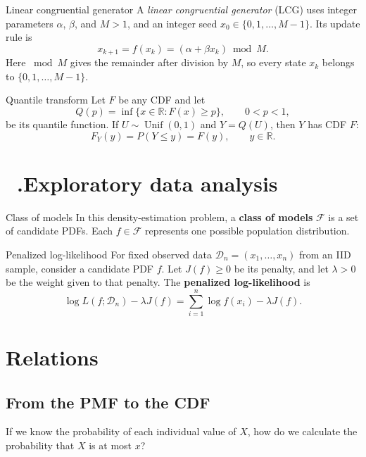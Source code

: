 \documentclass[12pt,a4paper,oneside]{report}
\newcommand{\notesheading}[1]{%
  \refstepcounter{chapter}%
  \section*{\chaptername~\thechapter.\enspace #1}}
\begin{document}
\begin{frameddefn}{Linear congruential generator}
\label{def:lcg}
A \emph{linear congruential generator} (LCG) uses integer parameters
$\alpha$, $\beta$, and $M>1$, and an integer seed
$x_0\in\{0,1,\ldots,M-1\}$. Its update rule is
\[
  x_{k+1}=f(x_k)=(\alpha+\beta x_k)\bmod M.
\]
Here $\bmod M$ gives the remainder after division by $M$, so every
state $x_k$ belongs to $\{0,1,\ldots,M-1\}$.
\end{frameddefn}

\begin{framedprop}{Quantile transform}
\label{prop:quantile-transform}
Let $F$ be any CDF and let
\[
  Q(p)=\inf\{x\in\mathbb R:F(x)\geq p\},\qquad 0<p<1,
\]
be its quantile function. If $U\sim\operatorname{Unif}(0,1)$ and
$Y=Q(U)$, then $Y$ has CDF $F$:
\[
  F_Y(y)=P(Y\leq y)=F(y),\qquad y\in\mathbb R.
\]
\end{framedprop}

\notesheading{Exploratory data analysis}

\begin{frameddefn}{Class of models}
In this density-estimation problem, a \textbf{class of models}
$\mathcal F$ is a set of candidate PDFs. Each $f\in\mathcal F$
represents one possible population distribution.
\end{frameddefn}

\begin{frameddefn}{Penalized log-likelihood}
\label{def:penalized-log-likelihood}
For fixed observed data $\mathcal D_n=(x_1,\ldots,x_n)$ from an
IID sample, consider a candidate PDF $f$. Let $J(f)\geq0$ be
its penalty, and let $\lambda>0$ be the weight given to that
penalty. The \textbf{penalized log-likelihood} is
\[
  \log L(f;\mathcal D_n)-\lambda J(f)
    =\sum_{i=1}^n\log f(x_i)-\lambda J(f).
\]
\end{frameddefn}

\clearpage
\section*{Relations}

\subsection*{From the PMF to the CDF}
\begin{tcolorbox}[colback=blue!3,colframe=blue!30!black,
  boxrule=0.4pt,arc=1mm,title={What we are trying to answer},
  colbacktitle=blue!10,coltitle=black,fonttitle=\bfseries]
If we know the probability of each individual
value of $X$, how do we calculate the probability that $X$ is at most $x$?
\end{tcolorbox}
\end{document}
